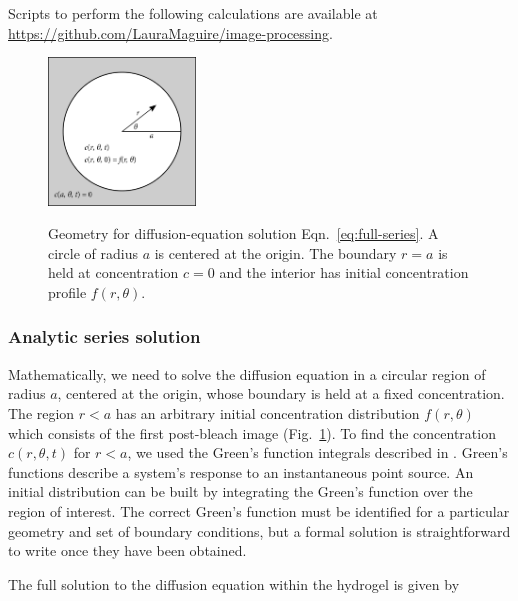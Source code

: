 Scripts to perform the following calculations are available at \url{https://github.com/LauraMaguire/image-processing}.

\begin{figure}
\caption[Geometry for Fourier transform solution.]{Geometry for diffusion-equation solution Eqn.~\ref{eq:full-series}.  A circle of radius $a$ is centered at the origin.  The boundary $r=a$ is held at concentration $c=0$ and the interior has initial concentration profile $f(r,\theta)$.}
\centering
\includegraphics[width=0.35\textwidth]{figs/ch04/carslaw-geometry}
\label{fig:carslaw-geo}
\end{figure} 

\subsubsection{Analytic series solution}

Mathematically, we need to solve the diffusion equation in a circular region of radius $a$, centered at the origin, whose boundary is held at a fixed concentration.  The region $r<a$ has an arbitrary initial concentration distribution $f(r,\theta)$ which consists of the first post-bleach image (Fig.~\ref{fig:carslaw-geo}).  To find the concentration $c(r,\theta,t)$ for $r<a$, we used the Green's function integrals described in \cite{h.s.carslaw59}.  Green's functions describe a system's response to an instantaneous point source.  An initial distribution can be built by integrating the Green's function over the region of interest.  The correct Green's function must be identified for a particular geometry and set of boundary conditions, but a formal solution is straightforward to write once they have been obtained.



The full solution to the diffusion equation within the hydrogel is given by \cite{h.s.carslaw59}

